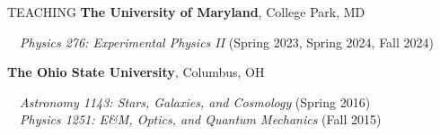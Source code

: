 \documentclass{resume} %
\begin{document}
\begin{rSection}{TEACHING}
{\bf The University of Maryland}, College Park, MD

\-\ \-\ \textit{Physics 276: Experimental Physics II} (Spring 2023, Spring 2024, Fall 2024)

{\bf The Ohio State University}, Columbus, OH 

\-\ \-\ \textit{Astronomy 1143: Stars, Galaxies, and Cosmology} (Spring 2016) \\
\-\ \-\ \textit{Physics 1251: E\&M, Optics, and Quantum Mechanics} (Fall 2015)




\end{rSection}
\newpage

\end{document}
